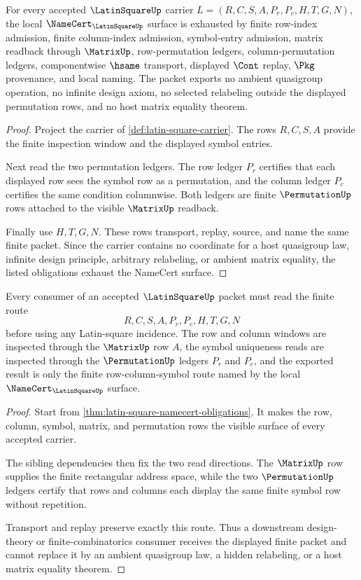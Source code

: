\begin{theorem}
\label{thm:latin-square-namecert-obligations}
For every accepted $\LatinSquareUp$ carrier $L=(R,C,S,A,P_r,P_c,H,T,G,N)$, the local $\NameCert_{\LatinSquareUp}$ surface is exhausted by finite row-index admission, finite column-index admission, symbol-entry admission, matrix readback through $\MatrixUp$, row-permutation ledgers, column-permutation ledgers, componentwise $\hsame$ transport, displayed $\Cont$ replay, $\Pkg$ provenance, and local naming. The packet exports no ambient quasigroup operation, no infinite design axiom, no selected relabeling outside the displayed permutation rows, and no host matrix equality theorem.
\end{theorem}
\begin{proof}
Project the carrier of \autoref{def:latin-square-carrier}. The rows $R,C,S,A$ provide the finite inspection window and the displayed symbol entries.

Next read the two permutation ledgers. The row ledger $P_r$ certifies that each displayed row sees the symbol row as a permutation, and the column ledger $P_c$ certifies the same condition columnwise. Both ledgers are finite $\PermutationUp$ rows attached to the visible $\MatrixUp$ readback.

Finally use $H,T,G,N$. These rows transport, replay, source, and name the same finite packet. Since the carrier contains no coordinate for a host quasigroup law, infinite design principle, arbitrary relabeling, or ambient matrix equality, the listed obligations exhaust the NameCert surface.
\end{proof}

\begin{theorem}
\label{thm:latin-square-row-column-symbol-route}
Every consumer of an accepted $\LatinSquareUp$ packet must read the finite route
$$
R,C,S,A,P_r,P_c,H,T,G,N
$$
before using any Latin-square incidence. The row and column windows are inspected through the $\MatrixUp$ row $A$, the symbol uniqueness reads are inspected through the $\PermutationUp$ ledgers $P_r$ and $P_c$, and the exported result is only the finite row-column-symbol route named by the local $\NameCert_{\LatinSquareUp}$ surface.
\end{theorem}
\begin{proof}
Start from \autoref{thm:latin-square-namecert-obligations}. It makes the row, column, symbol, matrix, and permutation rows the visible surface of every accepted carrier.

The sibling dependencies then fix the two read directions. The $\MatrixUp$ row supplies the finite rectangular address space, while the two $\PermutationUp$ ledgers certify that rows and columns each display the same finite symbol row without repetition.

Transport and replay preserve exactly this route. Thus a downstream design-theory or finite-combinatorics consumer receives the displayed finite packet and cannot replace it by an ambient quasigroup law, a hidden relabeling, or a host matrix equality theorem.
\end{proof}

